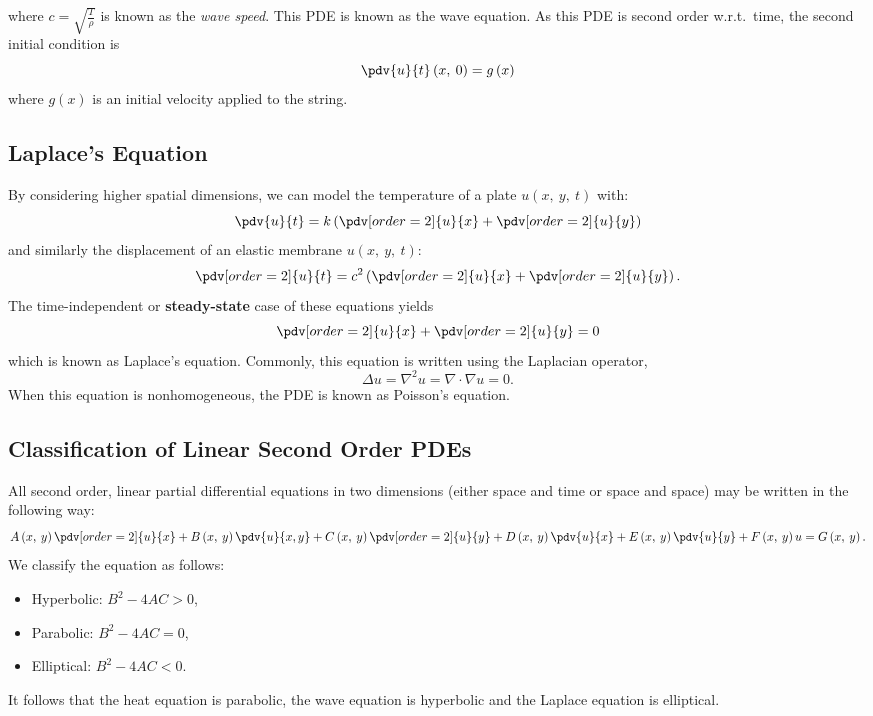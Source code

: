 \documentclass{article}
\begin{document}
where \(c = \sqrt{\frac{T}{\rho}}\) is known as the \textit{wave speed}. This PDE is known as the wave equation.
As this PDE is second order w.r.t.\ time, the second initial condition is
\begin{equation*}
    \pdv{u}{t}\left( x,\: 0 \right) = g\left( x \right)
\end{equation*}
where \(g\left( x \right)\) is an initial velocity applied to the string.
\subsection{Laplace's Equation}
By considering higher spatial dimensions, we can model the temperature
of a plate \(u\left( x,\: y,\: t \right)\) with:
\begin{equation*}
    \pdv{u}{t} = k \left( \pdv[order=2]{u}{x} + \pdv[order=2]{u}{y} \right)
\end{equation*}
and similarly the displacement of an elastic membrane \(u\left( x,\: y,\: t \right)\):
\begin{equation*}
    \pdv[order=2]{u}{t} = c^2 \left( \pdv[order=2]{u}{x} + \pdv[order=2]{u}{y} \right).
\end{equation*}
The time-independent or \textbf{steady-state} case of these equations yields
\begin{equation*}
    \pdv[order=2]{u}{x} + \pdv[order=2]{u}{y} = 0
\end{equation*}
which is known as Laplace's equation. Commonly, this equation is written using the Laplacian operator,
\begin{equation*}
    \Delta{u} = \nabla^2 u = \nabla \cdot \nabla u = 0.
\end{equation*}
When this equation is nonhomogeneous, the PDE is known as Poisson's equation.
\subsection{Classification of Linear Second Order PDEs}
All second order, linear partial differential equations in two
dimensions (either space and time or space and space) may be written in
the following way:
\begin{equation*}
    A\left( x,\: y \right) \pdv[order=2]{u}{x} + B\left( x,\: y \right) \pdv{u}{x,y} + C\left( x,\: y \right) \pdv[order=2]{u}{y} + D\left( x,\: y \right) \pdv{u}{x} + E\left( x,\: y \right) \pdv{u}{y} + F\left( x,\: y \right) u = G\left( x,\: y \right).
\end{equation*}
We classify the equation as follows:
\begin{itemize}
    \item Hyperbolic: \(B^2 - 4A C > 0\),
    \item Parabolic: \(B^2 - 4A C = 0\),
    \item Elliptical: \(B^2 - 4A C < 0\).
\end{itemize}
It follows that the heat equation is parabolic, the wave equation is hyperbolic and the Laplace equation is elliptical.
\end{document}
